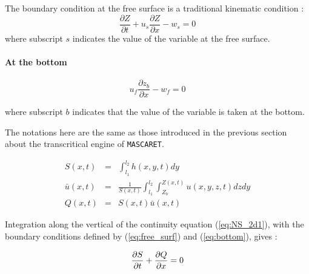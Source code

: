 \hspace*{1cm}


The boundary condition at the free surface is a traditional kinematic condition :
\begin{equation}
\frac{\partial Z}{\partial t} + u_s \frac{\partial Z}{\partial x}
-w_s = 0
\label{eq:free_surf}
\end{equation}
where subscript $s$ indicates the value of the variable at the free surface.  

\paragraph{At the bottom\\}

\hspace*{1cm}

\begin{equation}
 u_f \frac{\partial z_b}{\partial x}-w_f = 0
 \label{eq:bottom}
\end{equation}

\vspace{0.5cm}

where subscript $b$ indicates that the value of the variable is taken at the bottom.

\vspace{0.5cm}

The notations here are the same as those introduced in the previous section about the transcritical engine of \texttt{MASCARET}.

\begin{eqnarray}
 S(x,t) & = & \int_{l_{1}}^{l_{2}}h(x,y,t)dy \\
 \bar{u}(x,t) & = & \frac{1}{S(x,t)}\int_{l_{1}}^{l_{2}}\int_{Z_{b}}^{Z(x,t)}u(x,y,z,t)dzdy \\
 Q(x,t) & = & S(x,t)\bar{u}(x,t)
\end{eqnarray}

\vspace{0.5cm}

Integration along the vertical of the continuity equation (\ref{eq:NS_2d1}), with the boundary conditions defined by (\ref{eq:free_surf}) and (\ref{eq:bottom}), gives : 

\begin{equation}
  \frac{\partial{S}}{\partial{t}}+\frac{\partial{Q}}{\partial{x}}=0 \label{eq:STV_1d1}\\
\end{equation}

\vspace{0.5cm}

